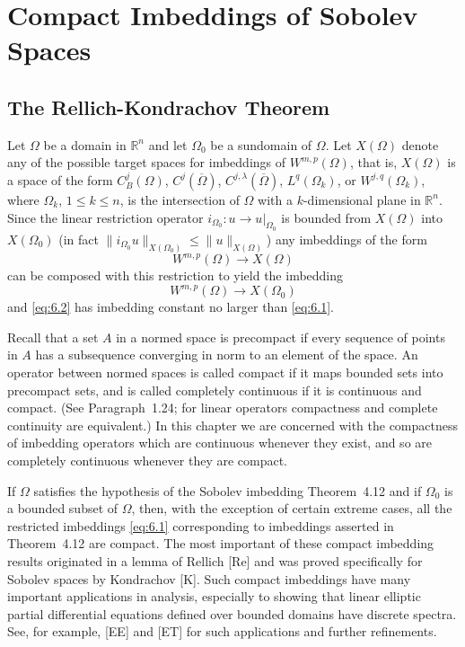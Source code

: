\setcounter{chapter}{5}
\chapter{Compact Imbeddings of Sobolev Spaces}

\section{The Rellich-Kondrachov Theorem}

\begin{para}
  Let $\Omega$ be a domain in $\mathbb{R}^n$ and let $\Omega_0$ be a sundomain of $\Omega$.
  Let $X(\Omega)$ denote any of the possible target spaces for imbeddings of $W^{m,p}(\Omega)$, that is,
  $X(\Omega)$ is a space of the form $C_B^j(\Omega)$, $C^j(\overline{\Omega})$,
  $C^{j,\lambda}(\overline{\Omega})$, $L^q(\Omega_k)$, or $W^{j,q}(\Omega_k)$, where $\Omega_k$, $1\leq k\leq n$,
  is the intersection of $\Omega$ with a $k$-dimensional plane in $\mathbb{R}^n$. Since the linear restriction 
  operator $i_{\Omega_0}: u\to u|_{\Omega_0}$ is bounded from $X(\Omega)$ into $X(\Omega_0)$
  (in fact $\|i_{\Omega_0}u\|_{X(\Omega_0)} \leq \|u\|_{X(\Omega)}$) any imbeddings of the form
  \begin{equation}\label{eq:6.1}
    W^{m,p}(\Omega) \to X(\Omega)
  \end{equation}
  can be composed with this restriction to yield the imbedding
  \begin{equation}\label{eq:6.2}
    W^{m,p}(\Omega) \to X(\Omega_0)
  \end{equation}
  and \eqref{eq:6.2} has imbedding constant no larger than \eqref{eq:6.1}.
\end{para}


\begin{para}
  Recall that a set $A$ in a normed space is precompact if every sequence of points in $A$ has a subsequence
  converging in norm to an element of the space. An operator between normed spaces is called compact if it
  maps bounded sets into precompact sets, and is called completely continuous if it is continuous and compact.
  (See Paragraph~1.24; for linear operators compactness and complete continuity are equivalent.)
  In this chapter we are concerned with the compactness of imbedding operators which are continuous whenever
  they exist, and so are completely continuous whenever they are compact.

  If $\Omega$ satisfies the hypothesis of the Sobolev imbedding Theorem~4.12 and if $\Omega_0$ is a bounded
  subset of $\Omega$, then, with the exception of certain extreme cases, all the restricted
  imbeddings \eqref{eq:6.1} corresponding to imbeddings asserted in Theorem~4.12 are compact.
  The most important of these compact imbedding results originated in a lemma of Rellich [Re] and was proved
  specifically for Sobolev spaces by Kondrachov [K]. Such compact imbeddings have many important applications
  in analysis, especially to showing that linear elliptic partial differential equations defined over
  bounded domains have discrete spectra. See, for example, [EE] and [ET] for such applications and further
  refinements.
\end{para}

